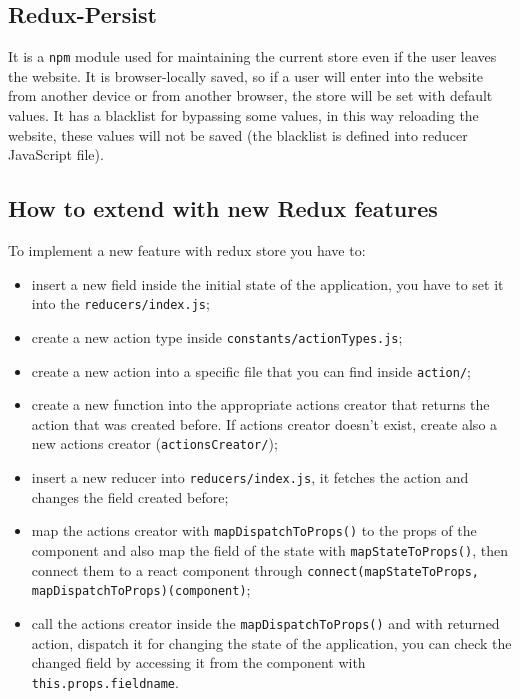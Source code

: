 \subsection{Redux-Persist}
It is a \texttt{npm} module used for maintaining the current store even if the user leaves the website. It is browser-locally saved, so if a user will enter into the website from another device or from another browser, the store will be set with default values. It has a blacklist for bypassing some values, in this way reloading the website, these values will not be saved (the blacklist is defined into reducer JavaScript file).

\subsection{How to extend with new Redux features}
To implement a new feature with redux store you have to:
\begin{itemize}
	\item insert a new field inside the initial state of the application, you have to set it into the \texttt{reducers/index.js};
	\item create a new action type inside \texttt{constants/actionTypes.js};
	\item create a new action into a specific file that you can find inside \texttt{action/};
	\item create a new function into the appropriate actions creator that returns the action that was created before. If actions creator doesn't exist, create also a new actions creator (\texttt{actionsCreator/});
	\item insert a new reducer into \texttt{reducers/index.js}, it fetches the action and changes the field created before;
	\item map the actions creator with \texttt{mapDispatchToProps()} to the props of the component and also map the field of the state with \texttt{mapStateToProps()}, then connect them to a react component through \texttt{connect(mapStateToProps, mapDispatchToProps)(component)};
	\item call the actions creator inside the \texttt{mapDispatchToProps()} and with returned action, dispatch it for changing the state of the application, you can check the changed field by accessing it from the component with \texttt{this.props.fieldname}. 
\end{itemize}
